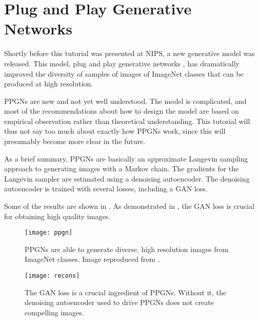 \section{Plug and Play Generative Networks}

Shortly before this tutorial was presented at NIPS, a new generative model
was released. This model, plug and play generative networks \citep{nguyen2016plug}, has dramatically
improved the diversity of samples of images of ImageNet classes that can be
produced at high resolution.

PPGNs are new and not yet well understood.
The model is complicated, and most of the recommendations about how to design the model
are based on empirical observation rather than theoretical understanding.
This tutorial will thus not say too much about exactly how PPGNs work, since this will
presumably become more clear in the future.

As a brief summary, PPGNs are basically an approximate Langevin sampling approach to
generating images with a Markov chain.
The gradients for the Langevin sampler are estimated using a denoising autoencoder.
The denoising autoencoder is trained with several losses, including a GAN loss.

Some of the results are shown in .
As demonstrated in , the GAN loss is crucial for obtaining high quality images.

\begin{figure}
\centering
\texttt{[image: ppgn]}
\caption{PPGNs are able to generate diverse, high resolution images from ImageNet
classes. Image reproduced from \citet{nguyen2016plug}.}
\label{fig:ppgn}
\end{figure}


\begin{figure}
\centering
\texttt{[image: recons]}
\caption{The GAN loss is a crucial ingredient of PPGNs. Without it, the denoising autoencoder
used to drive PPGNs does not create compelling images.}
\label{fig:recons}
\end{figure}


